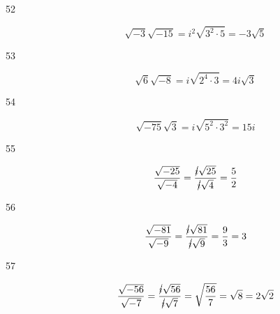 \documentclass[fleqn,addpoints]{exam}
\begin{document}
\begin{description}
\item[52]
\[
  \sqrt{-3} \sqrt{-15} = i^2 \sqrt{3^2 \cdot 5} = -3 \sqrt{5}
\]

\item[53]
\[
  \sqrt{6} \sqrt{-8} = i \sqrt{2^4 \cdot 3} = 4i \sqrt{3}
\]

\item[54]
\[
  \sqrt{-75} \sqrt{3} = i \sqrt{5^2 \cdot 3^2} = 15i
\]

\item[55]
\[
  \frac{\sqrt{-25}}{\sqrt{-4}} = \frac{\cancel{i} \sqrt{25}}{\cancel{i} \sqrt{4}} = \frac{5}{2}  
\]

\item[56]
\[
  \frac{ \sqrt{-81} }{ \sqrt{-9} } = \frac{ \cancel{i} \sqrt{81} }{ \cancel{i} \sqrt{9} } = \frac{9}{3} = 3
\]

\item[57]
\[
  \frac{ \sqrt{-56} }{ \sqrt{-7} } = \frac{ \cancel{i} \sqrt{56} }{ \cancel{i} \sqrt{7} } = \sqrt{\frac{56}{7}} 
  = \sqrt{8} = 2\sqrt{2}
\]

\end{description}
\end{document}
